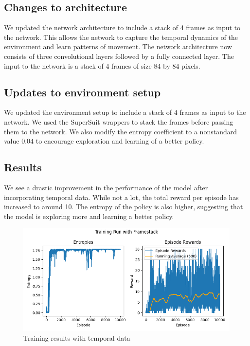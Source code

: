 \documentclass{article}
\begin{document}
\subsection{Changes to architecture}
We updated the network architecture to include a stack of 4 frames as input to the network. This allows the network to capture the temporal dynamics of the environment
and learn patterns of movement. The network architecture now consists of three convolutional layers followed by a fully connected layer. The input to the network is a stack of 4 frames
of size 84 by 84 pixels.

\subsection{Updates to environment setup}
We updated the environment setup to include a stack of 4 frames as input to the network. We used the SuperSuit wrappers to stack the frames before passing them to the network. We also modify
the entropy coefficient to a nonstandard value $0.04$ to encourage exploration and learning of a better policy.

\subsection{Results}
We see a drastic improvement in the performance of the model after incorporating temporal data. 
While not a lot, the total reward per episode has increased to around 10. The entropy of the policy is also higher, suggesting that the model is exploring more and learning a better policy.

\begin{figure}[h]
  \centering
  \includegraphics[scale=0.7]{metrics_framestack.png}
  \caption{Training results with temporal data}
  \label{fig:training_results_with_temporal}
\end{figure}
\end{document}
